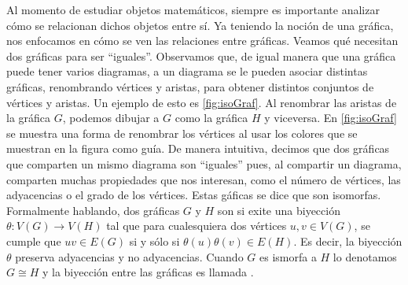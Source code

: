 Al momento de estudiar objetos matem\'aticos, siempre es importante analizar
c\'omo se relacionan dichos objetos entre s\'i. Ya teniendo la noci\'on de una
gr\'afica, nos enfocamos en c\'omo se ven las relaciones entre gr\'aficas.
Veamos qu\'e necesitan dos gr\'aficas para ser ``iguales''. Observamos que, de
igual manera que una gr\'afica puede tener varios diagramas, a un diagrama se le
pueden asociar distintas gr\'aficas, renombrando v\'ertices y aristas, para
obtener distintos conjuntos de v\'ertices y aristas. Un ejemplo de esto es
\cref{fig:isoGraf}. Al renombrar las aristas de la gr\'afica $G$, podemos
dibujar a $G$ como la gr\'afica $H$ y viceversa. En \cref{fig:isoGraf} se
muestra una forma de renombrar los v\'ertices al usar los colores que se
muestran en la figura como gu\'ia. De manera intuitiva, decimos que dos
gr\'aficas que comparten un mismo diagrama son ``iguales'' pues, al compartir un
diagrama, comparten muchas propiedades que nos interesan, como el n\'umero de
v\'ertices, las adyacencias o el grado de los v\'ertices. Estas g\'aficas se
dice que son isomorfas. Formalmente hablando, dos gr\'aficas $G$ y $H$ son
 si exite una biyecci\'on $\theta: V(G)
\rightarrow V(H)$ tal que para cualesquiera dos v\'ertices $u, v \in V(G)$, se
cumple que $uv \in E(G)$ si y s\'olo si $\theta(u)\theta(v) \in E(H)$. Es decir,
la biyecci\'on $\theta$ preserva adyacencias y no adyacencias. Cuando $G$ es
ismorfa a $H$ lo denotamos $G \cong H$ y la biyecci\'on entre las gr\'aficas es
llamada .

